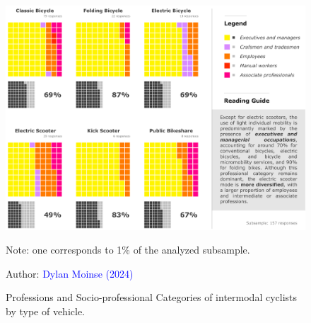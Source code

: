 \begin{refsegment}
    \begin{figure}[h!]\vspace*{4pt}
        \caption{Professions and Socio-professional Categories of intermodal cyclists by type of vehicle.}
        \label{fig-chap4:pcs}
        \centerline{\includegraphics[width=1\columnwidth]{src/Figures/Chap-4/EN_PCS.pdf}}
        \vspace{5pt}
        \begin{flushleft}\scriptsize{
        Note: one  corresponds to 1\% of the analyzed subsample.
        }\end{flushleft}
        \begin{flushright}\scriptsize{
        Author: \textcolor{blue}{Dylan Moinse (2024)}
        }\end{flushright}
    \end{figure}


\end{refsegment}
